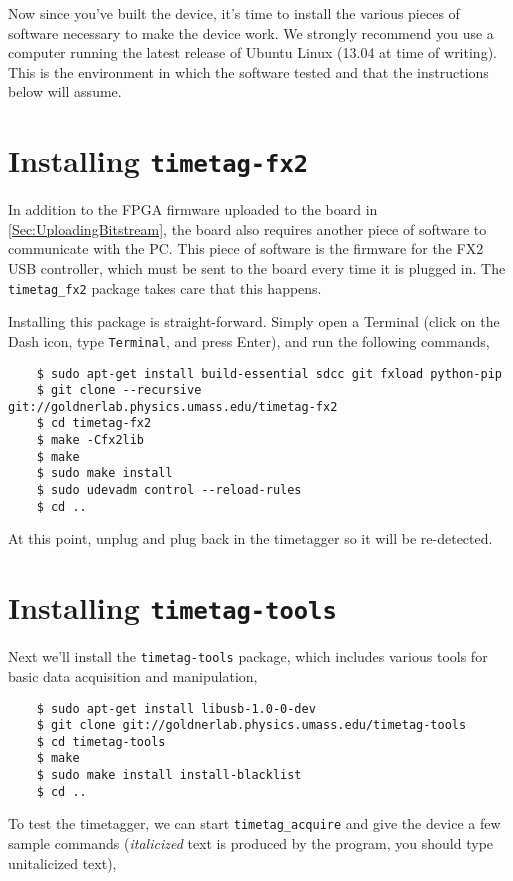 Now since you've built the device, it's time to install the various
pieces of software necessary to make the device work. We strongly
recommend you use a computer running the latest release of Ubuntu
Linux (13.04 at time of writing). This is the environment in which the
software tested and that the instructions below will assume.

\section{Installing {\tt timetag-fx2}}
In addition to the FPGA firmware uploaded to the board in
\ref{Sec:UploadingBitstream}, the board also requires another piece of
software to communicate with the PC. This piece of software is the
firmware for the FX2 USB controller, which must be sent to the board
every time it is plugged in. The {\tt timetag\_fx2} package takes care
that this happens.

Installing this package is straight-forward. Simply open a Terminal
(click on the Dash icon, type {\tt Terminal}, and press Enter), and
run the following commands,

\begin{verbatim}
    $ sudo apt-get install build-essential sdcc git fxload python-pip
    $ git clone --recursive git://goldnerlab.physics.umass.edu/timetag-fx2
    $ cd timetag-fx2
    $ make -Cfx2lib
    $ make
    $ sudo make install
    $ sudo udevadm control --reload-rules
    $ cd ..
\end{verbatim}

At this point, unplug and plug back in the timetagger so it will be
re-detected.

\section{Installing {\tt timetag-tools}}

Next we'll install the {\tt timetag-tools} package, which includes
various tools for basic data acquisition and manipulation,

\begin{verbatim}
    $ sudo apt-get install libusb-1.0-0-dev
    $ git clone git://goldnerlab.physics.umass.edu/timetag-tools
    $ cd timetag-tools
    $ make
    $ sudo make install install-blacklist
    $ cd ..
\end{verbatim}

To test the timetagger, we can start {\tt timetag\_acquire} and give
the device a few sample commands ({\it italicized} text is produced by
the program, you should type unitalicized text),

